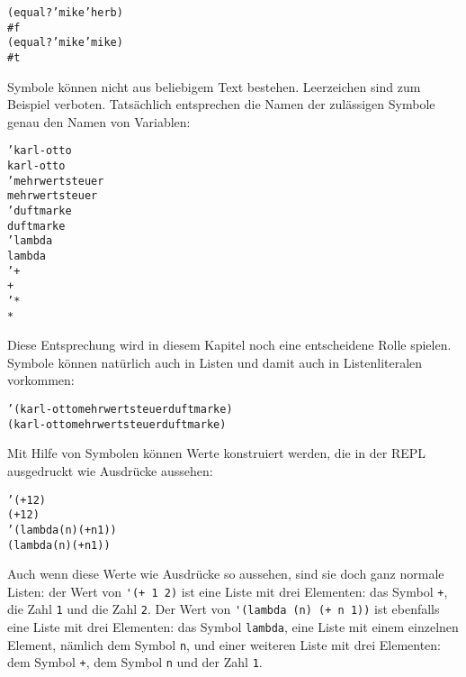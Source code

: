 \begin{alltt}
(equal? 'mike 'herb)
\evalsto{} #f
(equal? 'mike 'mike)
\evalsto{} #t
\end{alltt}

Symbole können nicht aus beliebigem Text bestehen.  
Leerzeichen sind zum Beispiel verboten.  Tatsächlich entsprechen die
Namen der zulässigen Symbole genau den Namen von Variablen:
%
\begin{alltt}
'karl-otto
\evalsto{} karl-otto
'mehrwertsteuer
\evalsto{} mehrwertsteuer
'duftmarke
\evalsto{} duftmarke
'lambda
\evalsto{} lambda
'+
\evalsto{} +
'*
\evalsto{} *
\end{alltt}
%
Diese Entsprechung wird in diesem Kapitel noch eine entscheidene Rolle
spielen.  Symbole können natürlich auch in Listen und damit auch in
Listenliteralen vorkommen:
%
\begin{alltt}
'(karl-otto mehrwertsteuer duftmarke)
\evalsto{} (karl-otto mehrwertsteuer duftmarke)
\end{alltt}
%
Mit Hilfe von Symbolen können Werte konstruiert werden, die in der REPL
ausgedruckt wie Ausdrücke aussehen:
%
\begin{alltt}
'(+ 1 2)
\evalsto{} (+ 1 2)
'(lambda (n) (+ n 1))
\evalsto{} (lambda (n) (+ n 1))
\end{alltt}
%
Auch wenn diese Werte wie Ausdrücke so aussehen, sind sie doch ganz
normale Listen: der Wert von \verb|'(+ 1 2)| ist eine Liste mit drei
Elementen: das Symbol \verb|+|, die Zahl \texttt{1} und die Zahl
\texttt{2}.  Der Wert von \verb|'(lambda (n) (+ n 1))| ist ebenfalls
eine Liste mit drei Elementen: das Symbol \verb|lambda|, eine Liste
mit einem einzelnen Element, nämlich dem Symbol \texttt{n}, und einer
weiteren Liste mit drei Elementen: dem Symbol \verb|+|, dem Symbol
\texttt{n} und der Zahl \texttt{1}.

